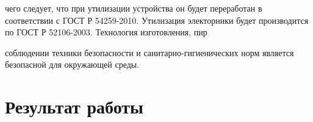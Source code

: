 \documentclass[a4paper]{article}
\begin{document}
чего следует, что при утилизации устройства он будет переработан в соответствии с ГОСТ Р 54259-2010. Утилизация электорники будет производится по ГОСТ Р 52106-2003. Технология изготовления, пир 

соблюдении техники безопасности и санитарно-гигиенических норм является безопасной для окружающей среды.
  \section{Результат работы}
\end{document}
